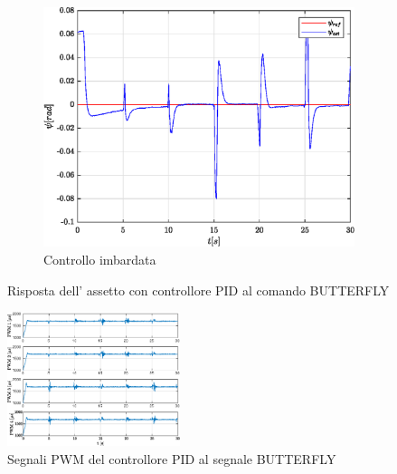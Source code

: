 \begin{figure}
	\hfill
	\begin{subfigure}{0.45\textwidth}
		\centering
		\includegraphics[width=1\textwidth]{Simulazioni/Figure/PID/BUTTERFLY/AttitudeControlYaw}
		\caption{Controllo imbardata}
		\label{fig:BUTTERFLYerryawPID}
	\end{subfigure}
	\caption{Risposta dell' assetto con controllore PID al comando BUTTERFLY}
\end{figure}


\begin{figure}
	\centering
	\includegraphics[width=0.45\textwidth]{Simulazioni/Figure/PID/BUTTERFLY/PWM}
	\caption{Segnali PWM del controllore PID al segnale BUTTERFLY}
	\label{fig:BUTTERFLYPWMPID}
\end{figure}

